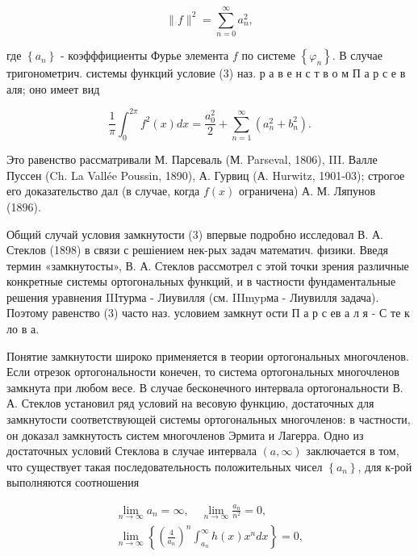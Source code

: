 \documentclass[10pt]{article}
\begin{document}
\[

\|f\|^{2}=\sum_{n=0}^{\infty} a_{n}^{2},

\]



где $\left\{a_{n}\right\}$ - коэфффициенты Фурье элемента $f$ по системе $\left\{\varphi_{n}\right\}$. В случае тригонометрич. системы функций условие (3) наз. р а в е н с т в о м П а р с е в аля; оно имеет вид



\[

\frac{1}{\pi} \int_{0}^{2 \pi} f^{2}(x) d x=\frac{a_{0}^{2}}{2}+\sum_{n=1}^{\infty}\left(a_{n}^{2}+b_{n}^{2}\right) .

\]



Это равенство рассматривали М. Парсеваль (М. Parseval, 1806), III. Валле Пуссен (Ch. La Vallée Poussin, 1890), А. Гурвиц (А. Hurwitz, 1901-03); строгое его доказательство дал (в случае, когда $f(x)$ ограничена) А. М. Ляпунов (1896).



Общий случай условия замкнутости (3) впервые подробно исследовал В. А. Стеклов (1898) в связи с решіением нек-рых задач математич. физики. Введя термин «замкнутосты», В. А. Стеклов рассмотрел с этой точки зрения различные конкретные системы ортогональных функций, и в частности фундаментальные решения уравнения IIIтурма - Лиувилля (см. IIImypма - Лиувилля задача). Поэтому равенство (3) часто наз. условием замкнут ости П а р с ев а л я - С те к ло в а.



Понятие замкнутости широко применяется в теории ортогональных многочленов. Если отрезок ортогональности конечен, то система ортогональных многочленов замкнута при любом весе. В случае бесконечного интервала ортогональности В. А. Стеклов установил ряд условий на весовую функцию, достаточных для замкнутости соответствующей системы ортогональных многочленов: в частности, он доказал замкнутость систем многочленов Эрмита и Лагерра. Одно из достаточных условий Стеклова в случае интервала $(a, \infty)$ заключается в том, что существует такая последовательность положительных чисел $\left\{a_{n}\right\}$, для к-рой выполняются соотношения



\[

\begin{gathered}

\lim _{n \rightarrow \infty} a_{n}=\infty, \quad \lim _{n \rightarrow \infty} \frac{a_{n}}{n^{2}}=0, \\

\lim _{n \rightarrow \infty}\left\{\left(\frac{4}{a_{n}}\right)^{n} \int_{a_{n}}^{\infty} h(x) x^{n} d x\right\}=0,

\end{gathered}

\]
\end{document}

